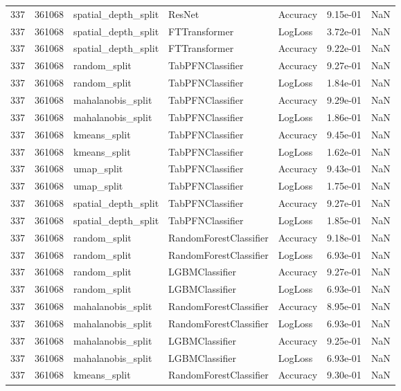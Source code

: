\begin{tabular}{rrlllrr}
337 & 361068 & spatial\_depth\_split & ResNet & Accuracy & 9.15e-01 & NaN \\
337 & 361068 & spatial\_depth\_split & FTTransformer & LogLoss & 3.72e-01 & NaN \\
337 & 361068 & spatial\_depth\_split & FTTransformer & Accuracy & 9.22e-01 & NaN \\
337 & 361068 & random\_split & TabPFNClassifier & Accuracy & 9.27e-01 & NaN \\
337 & 361068 & random\_split & TabPFNClassifier & LogLoss & 1.84e-01 & NaN \\
337 & 361068 & mahalanobis\_split & TabPFNClassifier & Accuracy & 9.29e-01 & NaN \\
337 & 361068 & mahalanobis\_split & TabPFNClassifier & LogLoss & 1.86e-01 & NaN \\
337 & 361068 & kmeans\_split & TabPFNClassifier & Accuracy & 9.45e-01 & NaN \\
337 & 361068 & kmeans\_split & TabPFNClassifier & LogLoss & 1.62e-01 & NaN \\
337 & 361068 & umap\_split & TabPFNClassifier & Accuracy & 9.43e-01 & NaN \\
337 & 361068 & umap\_split & TabPFNClassifier & LogLoss & 1.75e-01 & NaN \\
337 & 361068 & spatial\_depth\_split & TabPFNClassifier & Accuracy & 9.27e-01 & NaN \\
337 & 361068 & spatial\_depth\_split & TabPFNClassifier & LogLoss & 1.85e-01 & NaN \\
337 & 361068 & random\_split & RandomForestClassifier & Accuracy & 9.18e-01 & NaN \\
337 & 361068 & random\_split & RandomForestClassifier & LogLoss & 6.93e-01 & NaN \\
337 & 361068 & random\_split & LGBMClassifier & Accuracy & 9.27e-01 & NaN \\
337 & 361068 & random\_split & LGBMClassifier & LogLoss & 6.93e-01 & NaN \\
337 & 361068 & mahalanobis\_split & RandomForestClassifier & Accuracy & 8.95e-01 & NaN \\
337 & 361068 & mahalanobis\_split & RandomForestClassifier & LogLoss & 6.93e-01 & NaN \\
337 & 361068 & mahalanobis\_split & LGBMClassifier & Accuracy & 9.25e-01 & NaN \\
337 & 361068 & mahalanobis\_split & LGBMClassifier & LogLoss & 6.93e-01 & NaN \\
337 & 361068 & kmeans\_split & RandomForestClassifier & Accuracy & 9.30e-01 & NaN \\

\end{tabular}
